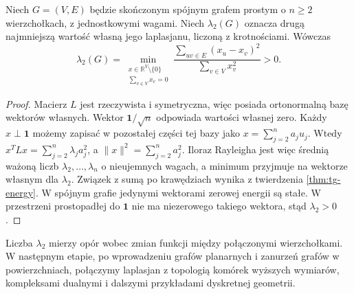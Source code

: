 \begin{twierdzenie}
Niech $G=(V,E)$ będzie skończonym spójnym grafem
prostym o $n\ge2$ wierzchołkach, z jednostkowymi
wagami. Niech $\lambda_2(G)$ oznacza drugą najmniejszą
wartość własną jego laplasjanu, liczoną z krotnościami.
Wówczas
\[
\lambda_2(G)=\min_{\substack{x\in\mathbb R^V\setminus\{0\}\\
               \sum_{v\in V}x_v=0}}
\frac{\sum_{uv\in E}(x_u-x_v)^2}{\sum_{v\in V}x_v^2}>0.
\]
\end{twierdzenie}

\begin{proof}
Macierz $L$ jest rzeczywista i symetryczna, więc posiada
ortonormalną bazę wektorów własnych. Wektor
$\mathbf1/\sqrt n$ odpowiada wartości własnej zero.
Każdy $x\perp\mathbf1$ możemy zapisać w pozostałej
części tej bazy jako $x=\sum_{j=2}^na_ju_j$.
Wtedy $x^TLx=\sum_{j=2}^n\lambda_ja_j^2$,
a $\|x\|^2=\sum_{j=2}^na_j^2$.
Iloraz Rayleigha jest więc średnią ważoną liczb
$\lambda_2,\ldots,\lambda_n$ o nieujemnych wagach,
a minimum przyjmuje na wektorze własnym dla
$\lambda_2$. Związek z sumą po krawędziach wynika
z twierdzenia \ref{thm:tg-energy}.
W spójnym grafie jedynymi wektorami zerowej energii
są stałe. W przestrzeni prostopadłej do $\mathbf1$
nie ma niezerowego takiego wektora, stąd $\lambda_2>0$.
\end{proof}

Liczba $\lambda_2$ mierzy opór wobec zmian funkcji między
połączonymi wierzchołkami. W następnym etapie, po wprowadzeniu
grafów planarnych i zanurzeń grafów w powierzchniach,
połączymy laplasjan z topologią komórek wyższych wymiarów,
kompleksami dualnymi i dalszymi przykładami dyskretnej geometrii.

